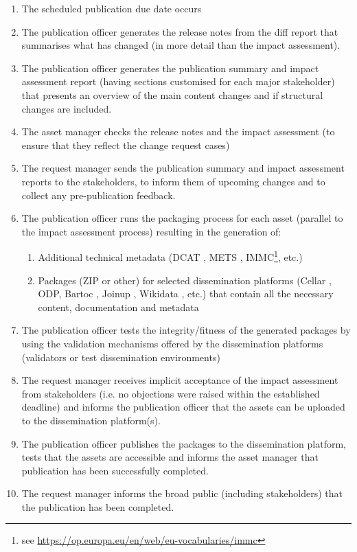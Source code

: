 	\begin{enumerate}
		\item The scheduled publication due date occurs
		\item The publication officer generates the release notes from the diff report that summarises what has changed (in more detail than the impact assessment).
		\item The publication officer generates the publication summary and impact assessment report (having sections customised for each major stakeholder) that presents an overview of the main content changes and if structural changes are included. 
		\item The asset manager checks the release notes and the impact assessment (to ensure that they reflect the change request cases)
		\item The request manager sends the publication summary and impact assessment reports to the stakeholders, to inform them of upcoming changes and to collect any pre-publication feedback.
		\item The publication officer runs the packaging process for each asset (parallel to the impact assessment process) resulting in the generation of: 
		\begin{enumerate}
			\item Additional technical metadata (DCAT \citep{dcat2}, METS \citep{mets}, IMMC\footnote{see \url{https://op.europa.eu/en/web/eu-vocabularies/immc}}, etc.)
			\item Packages (ZIP or other) for selected dissemination platforms (Cellar \citep{cdm-francesconi2015ontology}, ODP, Bartoc \citep{ledl2016describing}, Joinup \citep{hillenius2013free}, Wikidata \citep{vrandevcic2014wikidata}, etc.) that contain all the necessary content, documentation and metadata
		\end{enumerate}
		\item The publication officer tests the integrity/fitness of the generated packages by using the validation mechanisms offered by the dissemination platforms (validators or test dissemination environments)
		\item The request manager receives implicit acceptance of the impact assessment from stakeholders (i.e. no objections were raised within the established deadline) and informs the publication officer that the assets can be uploaded to the dissemination platform(s). 
		\item The publication officer publishes the packages to the dissemination platform, tests that the assets are accessible and informs the asset manager that publication has been successfully completed.
		\item The request manager informs the broad public (including stakeholders) that the publication has been completed.
		
	\end{enumerate}
	
